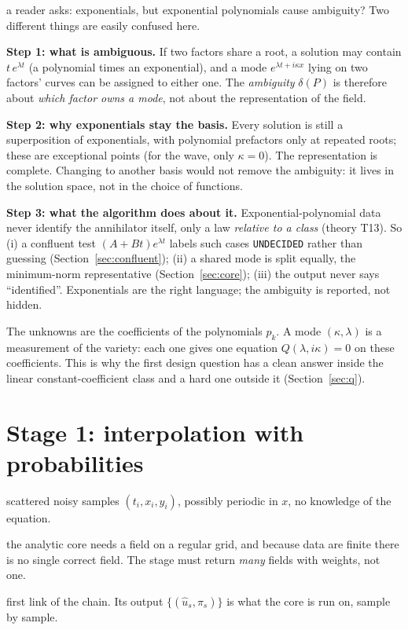 \documentclass[11pt,a4paper]{article}
\theoremstyle{definition}
\newcommand{\sectionbrief}[3]{\begin{leadin}\begin{description}[nosep,leftmargin=3.0cm,labelwidth=2.8cm]
  \item[Starting from] #1
  \item[Why this section] #2
  \item[Role in the paper] #3
  \end{description}\end{leadin}}
\newcommand{\thy}[1]{\textcolor{cG}{\textsf{\footnotesize(theory #1)}}}
\begin{document}
\begin{explained}{a reader asks: exponentials, but exponential polynomials cause ambiguity?}
Two different things are easily confused here.

\medskip\textbf{Step 1: what is ambiguous.} If two factors share a root, a solution may contain $t\,e^{\lambda t}$ (a polynomial times an exponential), and a mode $e^{\lambda t+i\kappa x}$ lying on two factors' curves can be assigned to either one. The \emph{ambiguity} $\delta(P)$ is therefore about \emph{which factor owns a mode}, not about the representation of the field.

\medskip\textbf{Step 2: why exponentials stay the basis.} Every solution is still a superposition of exponentials, with polynomial prefactors only at repeated roots; these are exceptional points (for the wave, only $\kappa=0$). The representation is complete. Changing to another basis would not remove the ambiguity: it lives in the solution space, not in the choice of functions.

\medskip\textbf{Step 3: what the algorithm does about it.} Exponential-polynomial data never identify the annihilator itself, only a law \emph{relative to a class} \thy{T13}. So (i) a confluent test $(A+Bt)e^{\lambda t}$ labels such cases \texttt{UNDECIDED} rather than guessing (Section~\ref{sec:confluent}); (ii) a shared mode is split equally, the minimum-norm representative (Section~\ref{sec:core}); (iii) the output never says ``identified''. Exponentials are the right language; the ambiguity is reported, not hidden.
\end{explained}

\begin{takeaway}
The unknowns are the coefficients of the polynomials $p_k$. A mode $(\kappa,\lambda)$ is a measurement of the variety: each one gives one equation $Q(\lambda,i\kappa)=0$ on these coefficients. This is why the first design question has a clean answer inside the linear constant-coefficient class and a hard one outside it (Section~\ref{sec:q}).
\end{takeaway}



\section{Stage 1: interpolation with probabilities}\label{sec:interp}
\sectionbrief
{scattered noisy samples $(t_i,x_i,y_i)$, possibly periodic in $x$, no knowledge of the equation.}
{the analytic core needs a field on a regular grid, and because data are finite there is no single correct field. The stage must return \emph{many} fields with weights, not one.}
{first link of the chain. Its output $\{(\hat u_s,\pi_s)\}$ is what the core is run on, sample by sample.}
\end{document}
